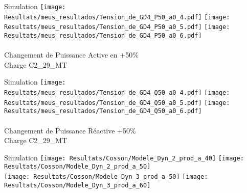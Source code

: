 \begin{frame}{Simulation}
\texttt{[image: Resultats/meus\_resultados/Tension\_de\_GD4\_P50\_a0\_4.pdf]}
\hfill
\texttt{[image: Resultats/meus\_resultados/Tension\_de\_GD4\_P50\_a0\_5.pdf]}
\hfill
\texttt{[image: Resultats/meus\_resultados/Tension\_de\_GD4\_P50\_a0\_6.pdf]}
\quad \\\quad\\ \centering \small  Changement de Puissance Active en +50\%\\ Charge C2\_29\_MT
\end{frame}

\begin{frame}{Simulation}
\texttt{[image: Resultats/meus\_resultados/Tension\_de\_GD4\_Q50\_a0\_4.pdf]}
\hfill
\texttt{[image: Resultats/meus\_resultados/Tension\_de\_GD4\_Q50\_a0\_5.pdf]}
\hfill
\texttt{[image: Resultats/meus\_resultados/Tension\_de\_GD4\_Q50\_a0\_6.pdf]}
\quad \\\quad\\ \centering \small  Changement de Puissance Réactive +50\%\\ Charge C2\_29\_MT
\end{frame}

\begin{frame}{Simulation}
	\centering
	\texttt{[image: Resultats/Cosson/Modele\_Dyn\_2\_prod\_a\_40]}\qquad
	\texttt{[image: Resultats/Cosson/Modele\_Dyn\_2\_prod\_a\_50]}
	\\\vspace{1em}
	\texttt{[image: Resultats/Cosson/Modele\_Dyn\_3\_prod\_a\_50]}\qquad
	\texttt{[image: Resultats/Cosson/Modele\_Dyn\_3\_prod\_a\_60]}
\end{frame}



